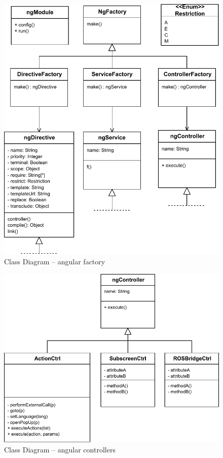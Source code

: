 \begin{figure}[htb]
    \centering
    \includegraphics{figures/design-class-ngfactory.pdf}
    \caption{Class Diagram -- angular factory}
    \label{fig:class-ngfactory}
\end{figure}

\begin{figure}[htb]
    \centering
    \includegraphics{figures/design-class-controllers.pdf}
    \caption{Class Diagram -- angular controllers}
    \label{fig:class-controllers}
\end{figure}


